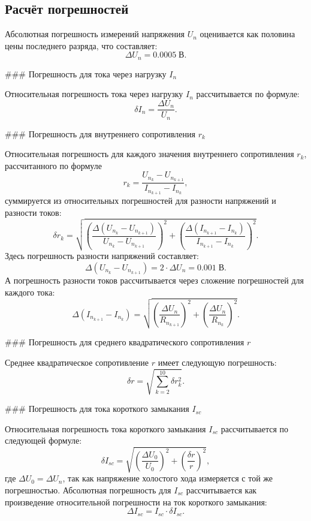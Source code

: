 \subsection{Расчёт погрешностей}

Абсолютная погрешность измерений напряжения \( U_n \) оценивается как половина цены последнего разряда, что составляет:
\[
\Delta U_n = 0.0005 \; \text{В}.
\]

### Погрешность для тока через нагрузку \( I_n \)

Относительная погрешность тока через нагрузку \( I_n \) рассчитывается по формуле:
\[
\delta I_n = \frac{\Delta U_n}{U_n}.
\]

### Погрешность для внутреннего сопротивления \( r_k \)

Относительная погрешность для каждого значения внутреннего сопротивления \( r_k \), рассчитанного по формуле
\[
r_k = \frac{U_{n_k} - U_{n_{k+1}}}{I_{n_{k+1}} - I_{n_k}},
\]
суммируется из относительных погрешностей для разности напряжений и разности токов:
\[
\delta r_k = \sqrt{\left(\frac{\Delta (U_{n_k} - U_{n_{k+1}})}{U_{n_k} - U_{n_{k+1}}}\right)^2 + \left(\frac{\Delta (I_{n_{k+1}} - I_{n_k})}{I_{n_{k+1}} - I_{n_k}}\right)^2}.
\]
Здесь погрешность разности напряжений составляет:
\[
\Delta (U_{n_k} - U_{n_{k+1}}) = 2 \cdot \Delta U_n = 0.001 \; \text{В}.
\]
А погрешность разности токов рассчитывается через сложение погрешностей для каждого тока:
\[
\Delta (I_{n_{k+1}} - I_{n_k}) = \sqrt{\left(\frac{\Delta U_n}{R_{n_{k+1}}}\right)^2 + \left(\frac{\Delta U_n}{R_{n_k}}\right)^2}.
\]

### Погрешность для среднего квадратического сопротивления \( r \)

Среднее квадратическое сопротивление \( r \) имеет следующую погрешность:
\[
\delta r = \sqrt{\sum_{k=2}^{10} \delta r_k^2}.
\]

### Погрешность для тока короткого замыкания \( I_{sc} \)

Относительная погрешность тока короткого замыкания \( I_{sc} \) рассчитывается по следующей формуле:
\[
\delta I_{sc} = \sqrt{\left(\frac{\Delta U_0}{U_0}\right)^2 + \left(\frac{\delta r}{r}\right)^2},
\]
где \( \Delta U_0 = \Delta U_n \), так как напряжение холостого хода измеряется с той же погрешностью. Абсолютная погрешность для \( I_{sc} \) рассчитывается как произведение относительной погрешности на ток короткого замыкания:
\[
\Delta I_{sc} = I_{sc} \cdot \delta I_{sc}.
\]
